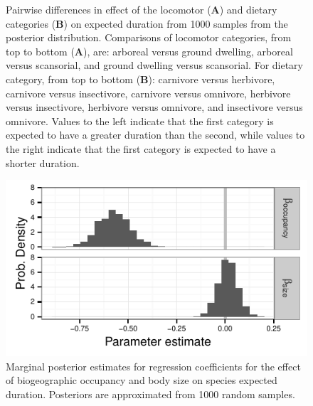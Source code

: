 \documentclass[12pt]{article}
\begin{document}
\begin{figure}[ht]
  \caption{Pairwise differences in effect of the locomotor (\textbf{A}) and dietary categories (\textbf{B}) on expected duration from 1000 samples from the posterior distribution. Comparisons of locomotor categories, from top to bottom (\textbf{A}), are: arboreal versus ground dwelling, arboreal versus scansorial, and ground dwelling versus scansorial. For dietary category, from top to bottom (\textbf{B}): carnivore versus herbivore, carnivore versus insectivore, carnivore versus omnivore, herbivore versus insectivore, herbivore versus omnivore, and insectivore versus omnivore. Values to the left indicate that the first category is expected to have a greater duration than the second, while values to the right indicate that the first category is expected to have a shorter duration.}
  \label{fig:trait_est}
\end{figure}

\begin{figure}[ht]
  \centering
  \includegraphics[height = 0.5\textheight, width = \textwidth, keepaspectratio = true]{figure/other_est}
  \caption{Marginal posterior estimates for regression coefficients for the effect of biogeographic occupancy and body size on species expected duration. Posteriors are approximated from 1000 random samples.}
  \label{fig:eff_other}
\end{figure}
\end{document}
